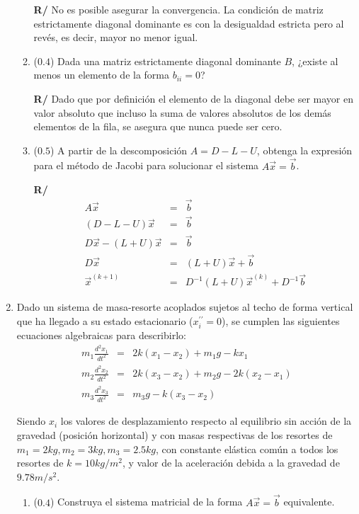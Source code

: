 \documentclass[12pt]{article}
\newcommand{\diff}[3]{\frac{d^{#3} #1}{d#2^{#3}}}
\begin{document}
\begin{enumerate}[leftmargin=*,widest=9]
\begin{enumerate}[label=\alph*]
\textbf{R/} No es posible asegurar la convergencia. La condición de matriz estrictamente diagonal dominante es con la desigualdad estricta pero al revés, es decir, mayor no menor igual.

    \item (\(0.4\)) Dada una matriz estrictamente diagonal dominante \(B\), ¿existe al menos un elemento de la forma \(b_{ii} = 0\)?
   
   \textbf{R/} Dado que por definición el elemento de la diagonal debe ser mayor en valor absoluto que incluso la suma de valores absolutos de los demás elementos de la fila, se asegura que nunca puede ser cero.
   
    \item (\(0.5\)) A partir de la descomposición \(A = D -L -U\), obtenga la expresión para el método de Jacobi para solucionar el sistema \(A\vec{x} = \vec{b}\).
   
   \textbf{R/}
   \begin{eqnarray*}
   A\vec{x} &=& \vec{b} \\
   (D -L -U)\vec{x} &=& \vec{b} \\
   D\vec{x} - (L+U)\vec{x} &=& \vec{b} \\
   D\vec{x} &=& (L+U)\vec{x} + \vec{b} \\
   \vec{x}^{(k+1)} &=& D^{-1}(L+U)\vec{x}^{(k)} + D^{-1}\vec{b}
   \end{eqnarray*}
   
    \end{enumerate}
        
   \item Dado un sistema de masa-resorte acoplados sujetos al techo de forma vertical que ha llegado a su estado estacionario (\(x_i^{\prime\prime} = 0\)), se cumplen las siguientes ecuaciones algebraicas para describirlo:
   \begin{eqnarray*}
   m_1 \diff{x_1}{t}{2} &=& 2k(x_1-x_2)+m_1g -kx_1 \\
   m_2 \diff{x_2}{t}{2} &=& 2k(x_3-x_2)+m_2g -2k(x_2 - x_1)  \\
   m_3 \diff{x_3}{t}{2} &=& m_3g -k(x_3-x_2)
   \end{eqnarray*}
   
   Siendo \(x_i\) los valores de desplazamiento respecto al equilibrio sin acción de la gravedad (posición horizontal) y con masas respectivas de los resortes de \(m_1 = 2kg, m_2=3kg, m_3=2.5kg\), con constante elástica común a todos los resortes de \(k= 10kg/m^2\), y valor de la aceleración debida a la gravedad de \(9.78m/s^2\).
   \begin{enumerate}[label=\alph*]
    \item (\(0.4\)) Construya el sistema matricial de la forma \(A\vec{x} = \vec{b}\) equivalente.
    

\end{enumerate}
\end{enumerate}
\end{document}
